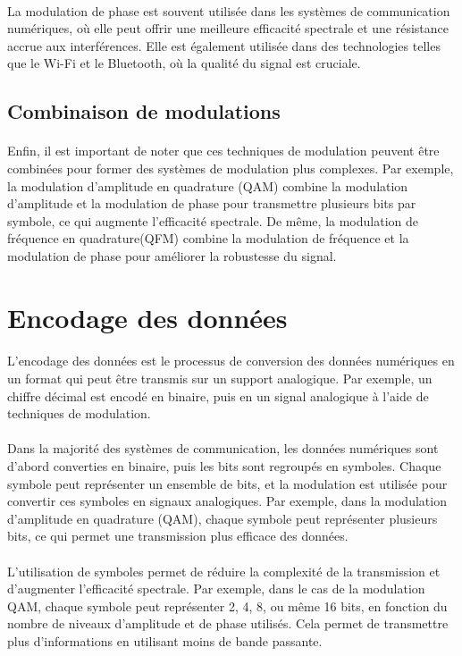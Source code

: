 \documentclass[a4paper,twocolumn]{report}
\begin{document}
\paragraph{}La modulation de phase est souvent utilisée dans les systèmes de communication numériques,
où elle peut offrir une meilleure efficacité spectrale et une résistance accrue aux interférences.
Elle est également utilisée dans des technologies telles que le Wi-Fi et le Bluetooth,
où la qualité du signal est cruciale.

\subsection{Combinaison de modulations}
\paragraph{}Enfin, il est important de noter que ces techniques de modulation peuvent
être combinées pour former des systèmes de modulation plus complexes.
Par exemple, la modulation d'amplitude en quadrature (QAM) combine la modulation
d'amplitude et la modulation de phase pour transmettre plusieurs bits par symbole,
ce qui augmente l'efficacité spectrale. De même, la modulation de fréquence en quadrature(QFM)
combine la modulation de fréquence et la modulation de phase pour améliorer la robustesse du signal.

\section{Encodage des données}

\paragraph{}L'encodage des données est le processus de conversion des données numériques
en un format qui peut être transmis sur un support analogique.
Par exemple, un chiffre décimal est encodé en binaire, puis en un signal
analogique à l'aide de techniques de modulation.
\paragraph{}Dans la majorité des systèmes de communication, les données numériques
sont d'abord converties en binaire, puis les bits sont regroupés en symboles.
Chaque symbole peut représenter un ensemble de bits, et la modulation est utilisée
pour convertir ces symboles en signaux analogiques.
Par exemple, dans la modulation d'amplitude en quadrature (QAM), chaque symbole
peut représenter plusieurs bits, ce qui permet une transmission plus efficace des données.
\paragraph{}L'utilisation de symboles permet de réduire la complexité de la transmission
et d'augmenter l'efficacité spectrale. Par exemple, dans le cas de la modulation QAM,
chaque symbole peut représenter 2, 4, 8, ou même 16 bits, en fonction du nombre de
niveaux d'amplitude et de phase utilisés. Cela permet de transmettre plus d'informations
en utilisant moins de bande passante.
\end{document}
